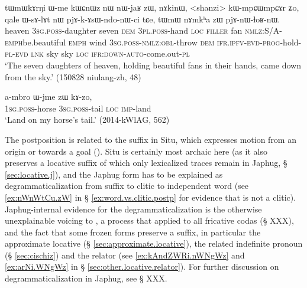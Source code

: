 \begin{exe}
\ex \label{ex:nAmkha.zW.pjAnWlhoRnW}
\gll tɯmɯkɤrŋi ɯ-me kɯɕnɯz nɯ nɯ-jaʁ zɯ, nɤkinɯ, <shanzi> kɯ-mpɕɯ\redp{}mpɕɤr ʑo, qale ɯ-sɤ-lɤt nɯ pjɤ-k-ɤsɯ-ndo-nɯ-ci tɕe,  tɯmɯ nɤmkʰa zɯ pjɤ-nɯ-ɬoʁ-nɯ. \\
heaven \textsc{3sg}.\textsc{poss}-daughter seven \textsc{dem} \textsc{3pl}.\textsc{poss}-hand \textsc{loc} \textsc{filler} fan \textsc{nmlz}:S/A-\textsc{emph}\redp{}be.beautiful \textsc{emph} wind \textsc{3sg}.\textsc{poss}-\textsc{nmlz}:\textsc{obl}-throw \textsc{dem} \textsc{ifr}.\textsc{ipfv}-\textsc{evd}-\textsc{prog}-hold-\textsc{pl}-\textsc{evd} \textsc{lnk} sky sky \textsc{loc} \textsc{ifr}:\textsc{down}-\textsc{auto}-come.out-\textsc{pl} \\
\glt `The seven daughters of heaven, holding beautiful fans in their hands, came down from the sky.' (150828 niulang-zh, 48)
\end{exe}

\begin{exe}
\ex \label{ex:Wjme.zW.kAzo}
\gll   a-mbro ɯ-jme zɯ kɤ-zo, \\
\textsc{1sg}.\textsc{poss}-horse \textsc{3sg}.\textsc{poss}-tail \textsc{loc} \textsc{imp}-land \\ 
\glt `Land on my horse's tail.' (2014-kWlAG, 562)
\end{exe}

The postposition  is related to the suffix  in Situ, which expresses motion from an origin or towards a goal (\citealt[330-331]{linxr93jiarongen}). Situ is certainly most archaic here (as it also preserves a locative  suffix of which only lexicalized traces remain in Japhug, § \ref{sec:locative.j}), and the Japhug form has to be explained as degrammaticalization  from suffix to clitic to independent word (see \ref{ex:nWnWtCu.zW} in § \ref{ex:word.vs.clitic.postp} for evidence that  is not a clitic). Japhug-internal evidence for the degrammaticalization is the otherwise unexplainable voicing to , a process that applied to all fricative codas (§ XXX), and the fact that some frozen forms preserve a  suffix, in particular the approximate locative  (§ \ref{sec:approximate.locative}), the related indefinite pronoun  (§ \ref{sec:cischiz}) and the relator  (see \ref{ex:kAndZWRi.nWNgWz}  and \ref{ex:arNi.WNgWz}  in § \ref{sec:other.locative.relator}). For further discussion on degrammaticalization in Japhug, see § XXX.


